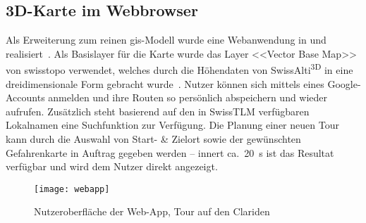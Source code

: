 \subsection{3D-Karte im Webbrowser}

Als Erweiterung zum reinen \gls{gis}-Modell wurde eine Webanwendung in  und  realisiert~\cite{vuedevman}\cite{maplibregljs}. Als Basislayer für die Karte wurde das Layer <<Vector Base Map>> von swisstopo verwendet, welches durch die Höhendaten von SwissAlti\textsuperscript{3D} in eine dreidimensionale Form gebracht wurde~\cite{basevtprod}\cite{alti3dprod}. Nutzer können sich mittels eines Google-Accounts anmelden und ihre Routen so persönlich abspeichern und wieder aufrufen. Zusätzlich steht basierend auf den in SwissTLM verfügbaren Lokalnamen eine Suchfunktion zur Verfügung.
Die Planung einer neuen Tour kann durch die Auswahl von Start- \& Zielort sowie der gewünschten Gefahrenkarte in Auftrag gegeben werden -- innert ca.\ \qty{20}{s} ist das Resultat verfügbar und wird dem Nutzer direkt angezeigt.


  \begin{figure}[H]
    \centering
    \texttt{[image: webapp]}
    \caption{Nutzeroberfläche der Web-App, Tour auf den Clariden}\label{fig:mainui}
  \end{figure}




